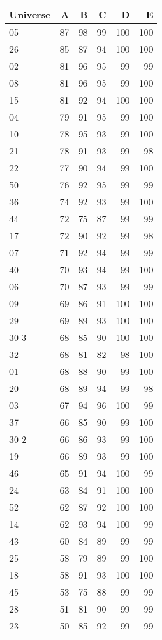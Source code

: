 \begin{tabular}{lrrrrr}
\toprule
Universe & A & B & C & D & E \\
\midrule
05 & 87 & 98 & 99 & 100 & 100 \\
26 & 85 & 87 & 94 & 100 & 100 \\
02 & 81 & 96 & 95 & 99 & 99 \\
08 & 81 & 96 & 95 & 99 & 100 \\
15 & 81 & 92 & 94 & 100 & 100 \\
04 & 79 & 91 & 95 & 99 & 100 \\
10 & 78 & 95 & 93 & 99 & 100 \\
21 & 78 & 91 & 93 & 99 & 98 \\
22 & 77 & 90 & 94 & 99 & 100 \\
50 & 76 & 92 & 95 & 99 & 99 \\
36 & 74 & 92 & 93 & 99 & 100 \\
44 & 72 & 75 & 87 & 99 & 99 \\
17 & 72 & 90 & 92 & 99 & 98 \\
07 & 71 & 92 & 94 & 99 & 99 \\
40 & 70 & 93 & 94 & 99 & 100 \\
06 & 70 & 87 & 93 & 99 & 99 \\
09 & 69 & 86 & 91 & 100 & 100 \\
29 & 69 & 89 & 93 & 100 & 100 \\
30-3 & 68 & 85 & 90 & 100 & 100 \\
32 & 68 & 81 & 82 & 98 & 100 \\
01 & 68 & 88 & 90 & 99 & 100 \\
20 & 68 & 89 & 94 & 99 & 98 \\
03 & 67 & 94 & 96 & 100 & 99 \\
37 & 66 & 85 & 90 & 99 & 100 \\
30-2 & 66 & 86 & 93 & 99 & 100 \\
19 & 66 & 89 & 93 & 99 & 100 \\
46 & 65 & 91 & 94 & 100 & 99 \\
24 & 63 & 84 & 91 & 100 & 100 \\
52 & 62 & 87 & 92 & 100 & 100 \\
14 & 62 & 93 & 94 & 100 & 99 \\
43 & 60 & 84 & 89 & 99 & 99 \\
25 & 58 & 79 & 89 & 99 & 100 \\
18 & 58 & 91 & 93 & 100 & 100 \\
45 & 53 & 75 & 88 & 99 & 99 \\
28 & 51 & 81 & 90 & 99 & 99 \\
23 & 50 & 85 & 92 & 99 & 99 \\
\end{tabular}

